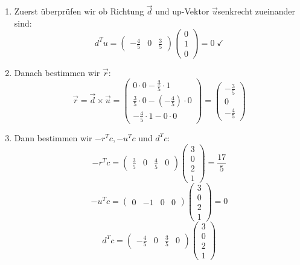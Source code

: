 \documentclass{article}
\begin{document}
\begin{enumerate}
    \item Zuerst überprüfen wir ob Richtung $\overrightarrow{d}$ und up-Vektor $\overrightarrow{u}$senkrecht zueinander sind:
    \[
    d^Tu= 
    \begin{pmatrix}
    -\frac{4}{5}&0&\frac{3}{5}
    \end{pmatrix}
    \begin{pmatrix}
    0\\1\\0
    \end{pmatrix}
    = 0 \;\checkmark
    \]
    \item
    Danach bestimmen wir $\overrightarrow{r}$:
    \[
    \overrightarrow{r}=\overrightarrow{d}\times\overrightarrow{u}=
    \begin{pmatrix}
    0\cdot0-\frac{3}{5}\cdot1\\
    \frac{3}{5}\cdot0-(-\frac{4}{5})\cdot 0\\
    -\frac{4}{5}\cdot 1 - 0\cdot 0
    \end{pmatrix}
    =
    \begin{pmatrix}
    -\frac{3}{5}\\
    0\\
    -\frac{4}{5}
    \end{pmatrix}
    \]
    \item
    Dann bestimmen wir $-r^Tc,-u^Tc$ und $d^Tc$:
    \[
    -r^Tc=
    \begin{pmatrix}
    \frac{3}{5}&0&\frac{4}{5}&0
    \end{pmatrix}
    \begin{pmatrix}
    3\\0\\2\\1
    \end{pmatrix}
    = \frac{17}{5}
    \]
    \[
    -u^Tc =
    \begin{pmatrix}
    0&-1&0&0
    \end{pmatrix}
    \begin{pmatrix}
    3\\0\\2\\1
    \end{pmatrix}
    = 0
    \]
    \[
    d^Tc=
    \begin{pmatrix}
    -\frac{4}{5}&0&\frac{3}{5}&0
    \end{pmatrix}
    \begin{pmatrix}
    3\\0\\2\\1

\end{pmatrix}\]
\end{enumerate}
\end{document}
